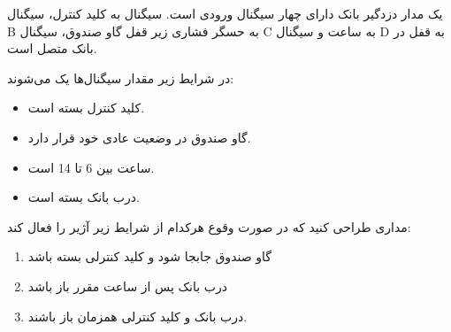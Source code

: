یک مدار دزدگیر بانک دارای چهار سیگنال ورودی  است. سیگنال  به کلید کنترل، سیگنال B به حسگر فشاری زیر قفل گاو صندوق، سیگنال C به ساعت و سیگنال D به قفل در بانک متصل است.

در شرایط زیر مقدار سیگنال‌ها یک می‌شوند:
\begin{itemize}
	\item 
	 کلید کنترل بسته است.
	 
	 \item 
	 گاو صندوق در وضعیت عادی خود قرار دارد.
	 
	 \item 
	 ساعت بین 6 تا 14 است.
	 
	 \item 
	 درب بانک بسته است.
\end{itemize}

مداری طراحی کنید که در صورت وقوع هرکدام از شرایط زیر آژیر را فعال کند:
\begin{enumerate}
	\item 
	گاو صندوق جابجا شود و کلید کنترلی بسته باشد
	
	\item 
	درب بانک پس از ساعت مقرر باز باشد
	
	\item 
	درب بانک و کلید کنترلی همزمان باز باشند.
\end{enumerate}